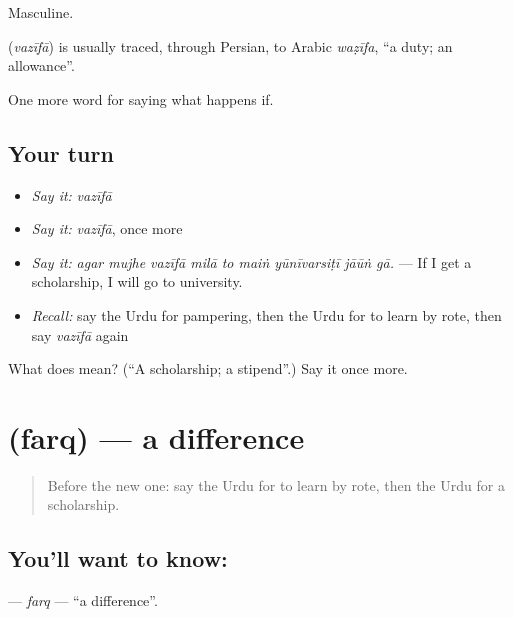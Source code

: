Masculine.

\begin{cousinweb}
\textbf{} (\emph{vazīfā}) is usually traced, through Persian, to Arabic \emph{waẓīfa}, \textquotedblleft{}a duty; an allowance\textquotedblright{}.
\end{cousinweb}

\begin{grammarlens}[title={What you've built}]
One more word for saying what happens if.
\end{grammarlens}

\subsection*{Your turn}
\begin{itemize}
\raggedright
  \item \emph{Say it:} \emph{vazīfā}
  \item \emph{Say it:} \emph{vazīfā}, once more
  \item \emph{Say it:} \emph{agar mujhe vazīfā milā to maiṅ yūnīvarsiṭī jāūṅ gā.} — If I get a scholarship, I will go to university.
  \item \emph{Recall:} say the Urdu for pampering, then the Urdu for to learn by rote, then say \emph{vazīfā} again
\end{itemize}

\begin{tcolorbox}[breakable,colback=teal!4,colframe=teal!35!black,title={Before you move on}]
What does  mean? (\textquotedblleft{}A scholarship; a stipend\textquotedblright{}.) Say it once more.
\end{tcolorbox}
\section[\texorpdfstring{\ur{فرق} (farq)}{فرق (farq)}]{ (farq) — a difference}

\label{lesson:UR-C385-farq}



\begin{quote}
Before the new one: say the Urdu for to learn by rote, then the Urdu for a scholarship.
\end{quote}

\subsection*{You'll want to know: }
\textbf{} — \emph{farq} — \textquotedblleft{}a difference\textquotedblright{}.

